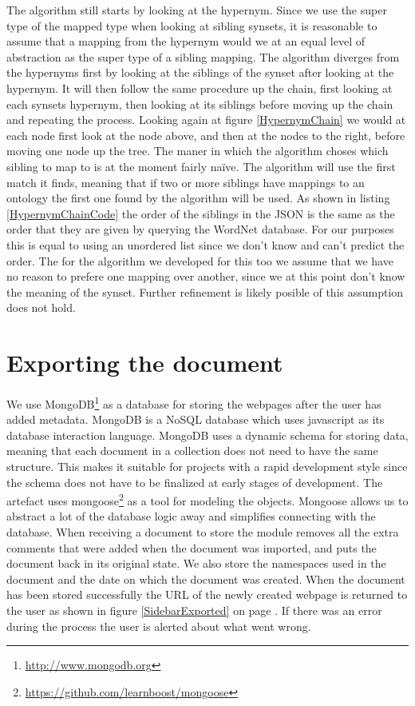 The algorithm still starts by looking at the hypernym.
Since we use the super type of the mapped type when looking at sibling synsets,
it is reasonable to assume that a mapping from the hypernym would we at an equal level of abstraction as the
super type of a sibling mapping.
The algorithm diverges from the hypernyms first by looking at the siblings of the synset after looking at the hypernym.
It will then follow the same procedure up the chain, first looking at each synsets hypernym,
then looking at its siblings before moving up the chain and repeating the process.
Looking again at figure \ref{HypernymChain} we would at each node first look at the node above,
and then at the nodes to the right, before moving one node up the tree.
The maner in which the algorithm choses which sibling to map to is at the moment fairly naïve.
The algorithm will use the first match it finds,
meaning that if two or more siblings have mappings to an ontology the first one found by the algorithm will be used.
As shown in listing \ref{HypernymChainCode} the order of the siblings in the JSON is the same as the order that they
are given by querying the WordNet database.
For our purposes this is equal to using an unordered list since we don't know and can't predict the order.
The for the algorithm we developed for this too we assume  that we have no reason to prefere one mapping over another,
since we at this point don't know the meaning of the synset.
Further refinement is likely posible of this assumption does not hold.

\section{Exporting the document}
We use MongoDB\footnote{\url{http://www.mongodb.org}} as a database for storing the webpages after the user has added metadata.
MongoDB is a NoSQL database which uses javascript as its database interaction language.
MongoDB uses a dynamic schema for storing data,
meaning that each document in a collection does not need to have the same structure.
This makes it suitable for projects with a rapid development style since the schema does not have to be
finalized at early stages of development.
The artefact uses mongoose\footnote{\url{https://github.com/learnboost/mongoose}} as a tool for modeling the objects.
Mongoose allows us to abstract a lot of the database logic away and simplifies connecting with the database.
When receiving a document to store the module removes all the extra comments that were added when the document was
imported, and puts the document back in its original state.
We also store the namespaces used in the document and the date on which the document was created.
When the document has been stored successfully the URL of the newly created webpage is returned to the user as shown in
figure \ref{SidebarExported} on page \pageref{SidebarExported}.
If there was an error during the process the user is alerted about what went wrong.

